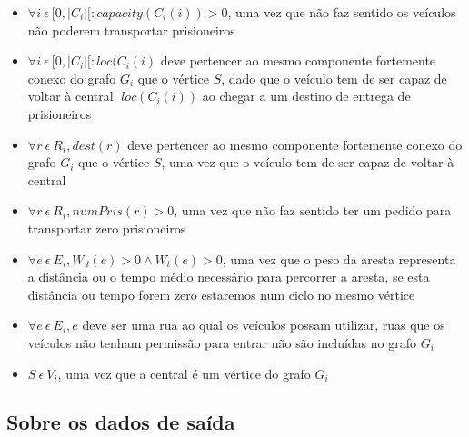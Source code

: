 \documentclass[article, a4paper, 12pt, oneside]{memoir}
\begin{document}
\begin{itemize}
	\item $\forall i ~ \epsilon ~ [0, \vert C_i \vert [: capacity(C_i(i)) > 0$, uma vez que não faz sentido os veículos não poderem transportar prisioneiros
	\item $\forall i ~ \epsilon ~ [0, \vert C_i \vert [: loc(C_i(i)$ deve pertencer ao mesmo componente fortemente conexo do grafo $G_i$ que o vértice $S$, dado que o veículo tem de ser capaz de voltar à central. $loc(C_i(i))$ ao chegar a um destino de entrega de prisioneiros
	\item $\forall r ~ \epsilon ~ R_i, dest(r)$ deve pertencer ao mesmo componente fortemente conexo do grafo $G_i$ que o vértice $S$, uma vez que o veículo tem de ser capaz de voltar à central
	\item $\forall r ~ \epsilon ~ R_i, numPris(r) > 0$, uma vez que não faz sentido ter um pedido para transportar zero prisioneiros
	\item $\forall e ~ \epsilon ~ E_i, W_d(e) > 0 \wedge W_t(e) > 0$, uma vez que o peso da aresta representa a distância ou o tempo médio necessário para percorrer a aresta, se esta distância ou tempo forem zero estaremos num ciclo no mesmo vértice
	\item $\forall e ~ \epsilon ~ E_i, e$ deve ser uma rua ao qual os veículos possam utilizar, ruas que os veículos não tenham permissão para entrar não são incluídas no grafo $G_i$
	\item $S ~ \epsilon ~ V_i$, uma vez que a central é um vértice do grafo $G_i$
\end{itemize}

\subsection{Sobre os dados de saída}
\end{document}
